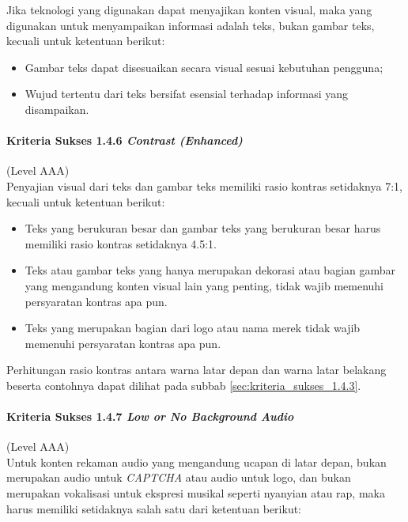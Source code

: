 Jika teknologi yang digunakan dapat menyajikan konten visual, maka yang digunakan untuk menyampaikan informasi adalah teks, bukan gambar teks, kecuali untuk ketentuan berikut:

\begin{itemize}
	\item Gambar teks dapat disesuaikan secara visual sesuai kebutuhan pengguna;
	\item Wujud tertentu dari teks bersifat esensial terhadap informasi yang disampaikan.
\end{itemize}

\paragraph{Kriteria Sukses 1.4.6 \textit{Contrast (Enhanced)}}
\label{sec:kriteria_sukses_1.4.6}
(Level AAA)\\

Penyajian visual dari teks dan gambar teks memiliki rasio kontras setidaknya 7:1, kecuali untuk ketentuan berikut:

\begin{itemize}
	\item Teks yang berukuran besar dan gambar teks yang berukuran besar harus memiliki rasio kontras setidaknya 4.5:1.
	\item Teks atau gambar teks yang hanya merupakan dekorasi atau bagian gambar yang mengandung konten visual lain yang penting, tidak wajib memenuhi persyaratan kontras apa pun.
	\item Teks yang merupakan bagian dari logo atau nama merek tidak wajib memenuhi persyaratan kontras apa pun.
\end{itemize}

Perhitungan rasio kontras antara warna latar depan dan warna latar belakang beserta contohnya dapat dilihat pada subbab \ref{sec:kriteria_sukses_1.4.3}.

\paragraph{Kriteria Sukses 1.4.7 \textit{Low or No Background Audio}}
\label{sec:kriteria_sukses_1.4.7}
(Level AAA)\\

Untuk konten rekaman audio yang mengandung ucapan di latar depan, bukan merupakan audio untuk \textit{CAPTCHA} atau audio untuk logo, dan bukan merupakan vokalisasi untuk ekspresi musikal seperti nyanyian atau rap, maka harus memiliki setidaknya salah satu dari ketentuan berikut:

